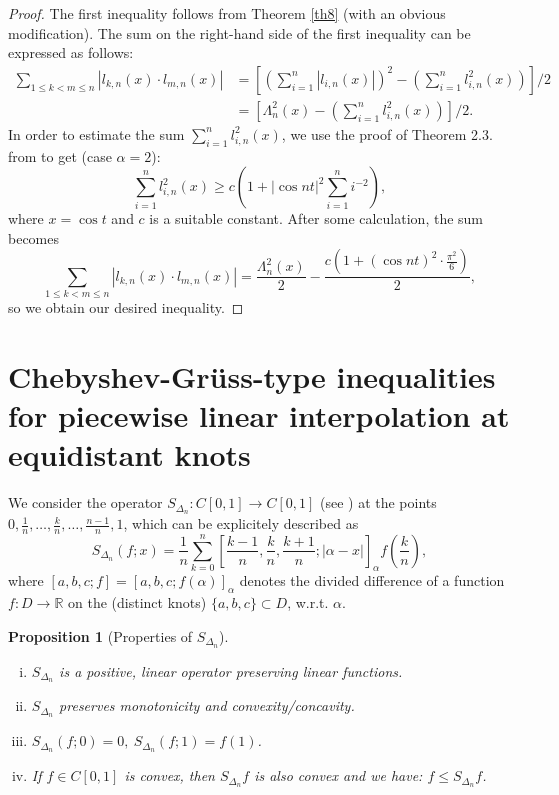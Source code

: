 \documentclass[12pt,leqno,a4paper,dvips,twoside]{article}
\newcommand*{\R}{\ensuremath{\mathbb{R}}}               %
\newtheorem{prop}[thm]{Proposition}%
\begin{document}
{\begin{proof}
	The first inequality follows from Theorem \ref{th8} (with an obvious modification). 
	The sum on the right-hand side of the first inequality can  be expressed as follows:
	\begin{align*}
	\sum_{1\leq k<m\leq n}{\left|l_{k,n}(x)\cdot l_{m,n}(x)\right|}&=\left[\left(\sum^{n}_{i=1}{\left|l_{i,n}(x)\right|}\right)^2-\left(\sum^{n}_{i=1}{l^2_{i,n}(x)}\right)\right]/2\\
	&=\left[\Lambda^2_n(x)-\left(\sum^{n}_{i=1}{l^2_{i,n}(x)}\right)\right]/2.
	\end{align*}
In order to estimate the sum $\sum^{n}_{i=1}{l^2_{i,n}(x)}$, we use the proof of Theorem 2.3. from \cite{hermann:1981} to get (case $\alpha=2$):
	\begin{equation*}
		\sum^{n}_{i=1}{l^2_{i,n}(x)}\geq c\left(1+\left|\cos nt\right|^2\sum ^{n}_{i=1}{i^{-2}}\right),  
	\end{equation*}
where $x=\cos t$ and $c$ is a suitable constant. 
After some calculation, the sum becomes
\begin{equation*}
	\sum_{1\leq k<m\leq n}{\left|l_{k,n}(x)\cdot l_{m,n}(x)\right|}
	=\frac{\Lambda^2_n(x)}{2}-\frac{c\left(1+(\cos nt)^2\cdot \frac{\pi ^2}{6}\right)}{2},
\end{equation*}
so we obtain our desired inequality.	
\end{proof}

\section{Chebyshev-Gr\"{u}ss-type inequalities for piecewise linear interpolation at equidistant knots}

We consider the operator $S_{\Delta_n}:C[0,1]\to C[0,1]$ (see \cite{gonska:2011}) at the points $0,\frac{1}{n},\ldots, \frac{k}{n},\ldots, \frac{n-1}{n},1$, which can be explicitely described as 
	\begin{equation*}
		S_{\Delta_n}(f;x)=\frac{1}{n}\sum^{n}_{k=0}{\left[\frac{k-1}{n},\frac{k}{n},\frac{k+1}{n};\left|\alpha-x\right|\right]_{\alpha} f\left(\frac{k}{n}\right)},
	\end{equation*}
where $[a,b,c;f]=[a,b,c;f(\alpha)]_{\alpha}$ denotes the divided difference of a function $f:D\to\R$ on the
(distinct knots) $\{a,b,c\}\subset D$, w.r.t. $\alpha$.

\begin{prop}[Properties of $S_{\Delta_n}$]
	\begin{enumerate}[i)]\mbox{}
		\item
			$S_{\Delta_n}$ is a positive, linear operator preserving linear functions.
		\item
			$S_{\Delta_n}$ preserves monotonicity and convexity/concavity. 
		\item
			$S_{\Delta_n}(f;0)=0,\ S_{\Delta_n}(f;1)=f(1)$.
		\item
			If $f\in C[0,1]$ is convex, then $S_{\Delta_n}f$ is also convex and we have: $f\leq S_{\Delta_n}f$.
	\end{enumerate}
\end{prop}

}
\end{document}
